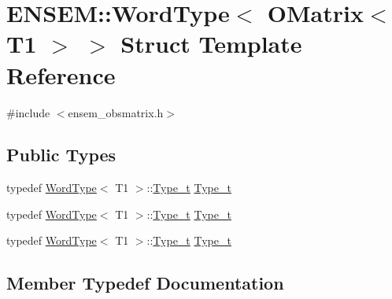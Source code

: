 \hypertarget{structENSEM_1_1WordType_3_01OMatrix_3_01T1_01_4_01_4}{}\section{E\+N\+S\+EM\+:\+:Word\+Type$<$ O\+Matrix$<$ T1 $>$ $>$ Struct Template Reference}
\label{structENSEM_1_1WordType_3_01OMatrix_3_01T1_01_4_01_4}


{\ttfamily \#include $<$ensem\+\_\+obsmatrix.\+h$>$}

\subsection*{Public Types}
\begin{DoxyCompactItemize}
\item 
typedef \mbox{\hyperlink{structENSEM_1_1WordType}{Word\+Type}}$<$ T1 $>$\+::\mbox{\hyperlink{structENSEM_1_1WordType_3_01OMatrix_3_01T1_01_4_01_4_a37e42971b324dfc3027d9f416e3d7d00}{Type\+\_\+t}} \mbox{\hyperlink{structENSEM_1_1WordType_3_01OMatrix_3_01T1_01_4_01_4_a37e42971b324dfc3027d9f416e3d7d00}{Type\+\_\+t}}
\item 
typedef \mbox{\hyperlink{structENSEM_1_1WordType}{Word\+Type}}$<$ T1 $>$\+::\mbox{\hyperlink{structENSEM_1_1WordType_3_01OMatrix_3_01T1_01_4_01_4_a37e42971b324dfc3027d9f416e3d7d00}{Type\+\_\+t}} \mbox{\hyperlink{structENSEM_1_1WordType_3_01OMatrix_3_01T1_01_4_01_4_a37e42971b324dfc3027d9f416e3d7d00}{Type\+\_\+t}}
\item 
typedef \mbox{\hyperlink{structENSEM_1_1WordType}{Word\+Type}}$<$ T1 $>$\+::\mbox{\hyperlink{structENSEM_1_1WordType_3_01OMatrix_3_01T1_01_4_01_4_a37e42971b324dfc3027d9f416e3d7d00}{Type\+\_\+t}} \mbox{\hyperlink{structENSEM_1_1WordType_3_01OMatrix_3_01T1_01_4_01_4_a37e42971b324dfc3027d9f416e3d7d00}{Type\+\_\+t}}
\end{DoxyCompactItemize}


\subsection{Member Typedef Documentation}
\mbox{\label{structENSEM_1_1WordType_3_01OMatrix_3_01T1_01_4_01_4_a37e42971b324dfc3027d9f416e3d7d00}} 
